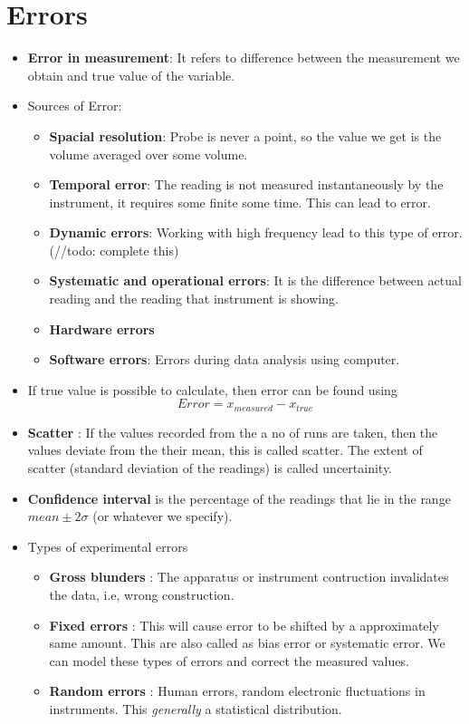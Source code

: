 \documentclass{article}
\begin{document}
\section{Errors}
	\begin{itemize}
	\item \textbf{Error in measurement}: It refers to difference between the measurement we obtain and true value of the variable.
	\item {Sources of Error}:
		\begin{itemize}
			\item \textbf{Spacial resolution}: Probe is never a point, so the value we get is the volume averaged over some volume.
			\item \textbf{Temporal error}: The reading is not measured instantaneously by the instrument, it requires some finite some time. This can lead to error. 
			\item \textbf{Dynamic errors}: Working with high frequency lead to this type of error. (//todo: complete this)
			\item \textbf{Systematic and operational errors}: It is the difference between actual reading and the reading that instrument is showing.
			\item \textbf{Hardware errors}
			\item \textbf{Software errors}: Errors during data analysis using computer.
		\end{itemize}

	\item If true value is possible to calculate, then error can be found using
		\[Error = x_{measured}- x_{true}\]

	\item \textbf{Scatter} : If the values recorded from the a no of runs are taken, then the values deviate from the their mean, this is called scatter. The extent of scatter (standard deviation of the readings) is called uncertainity.
	\item \textbf{Confidence interval} is the percentage of the readings that lie in the range $mean \pm 2 \sigma$ (or whatever we specify).
	\item Types of experimental errors
		\begin{itemize}
		\item \textbf{Gross blunders} : The apparatus or instrument contruction invalidates the data, i.e, wrong construction.
		\item \textbf{Fixed errors} : This will cause error to be shifted by a approximately same amount. This are also called as bias error or systematic error. We can model these types of errors and correct the measured values.
		\item \textbf{Random errors} : Human errors, random electronic fluctuations in instruments. This \emph{generally} a statistical distribution.
		\end{itemize}
	\end{itemize}
\end{document}
